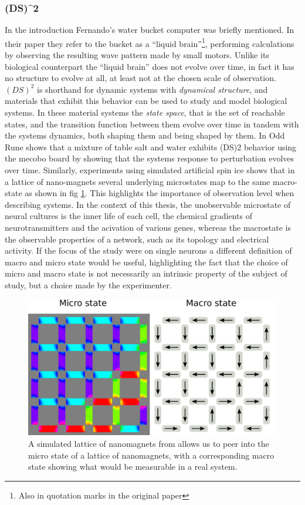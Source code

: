 \subsubsection{(DS)^2}
%
In the introduction Fernando's water bucket computer
\cite{fernando_pattern_2003} was briefly mentioned.
In their paper they refer to the bucket as a ``liquid brain''\footnote{Also in
  quotation marks in the original paper}, performing calculations by observing
the resulting wave pattern made by small motors.
Unlike its biological counterpart the ``liquid brain'' does not evolve over
time, in fact it has no structure to evolve at all, at least not at the chosen
scale of observation.
%
$(DS)^2$ is shorthand for dynamic systems with \emph{dynamical structure}, and
materials that exhibit this behavior can be used to study and model biological
systems.
In these material systems the \emph{state space}, that is the set of reachable
states, and the transition function between them evolve over time in tandem with
the systems dynamics, both shaping them and being shaped by them.
%
In \cite{eimDS2} Odd Rune shows that a mixture of table salt and
water exhibits (DS)2 behavior using the mecobo board by showing that the systems
response to perturbation evolves over time.
%
Similarly, experiments using simulated artificial spin ice \cite{joh_ASI}
shows that in a lattice of nano-magnets several underlying microstates map to the
same macro-state as shown in fig \ref{figJohASI}.
This highlights the importance of observation level when describing systems.
In the context of this thesis, the unobservable microstate of neural cultures is the
inner life of each cell, the chemical gradients of neurotransmitters and the
acivation of various genes, whereas the macrostate is the observable properties
of a network, such as its topology and electrical activity.
If the focus of the study were on single neurons a different definition of macro
and micro state would be useful, highlighting the fact that the choice of micro
and macro state is not necessarily an intrinsic property of the subject of
study, but a choice made by the experimenter.
\begin{figure}[h]
  \centering
  \includegraphics[width=1\textwidth]{fig/joh_ASI.png}
  \caption{
    A simulated lattice of nanomagnets from \cite{joh_ASI} allows us to peer
    into the micro state of a lattice of nanomagnets, with a corresponding macro
    state showing what would be measurable in a real system.
  }
  \label{figJohASI}
\end{figure}
